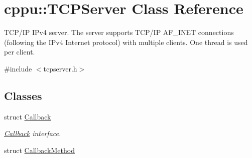\hypertarget{classcppu_1_1_t_c_p_server}{}\section{cppu\+:\+:T\+C\+P\+Server Class Reference}
\label{classcppu_1_1_t_c_p_server}


T\+C\+P/\+IP I\+Pv4 server. The server supports T\+C\+P/\+IP A\+F\+\_\+\+I\+N\+ET connections (following the I\+Pv4 Internet protocol) with multiple clients. One thread is used per client.  




{\ttfamily \#include $<$tcpserver.\+h$>$}

\subsection*{Classes}
\begin{DoxyCompactItemize}
\item 
struct \mbox{\hyperlink{structcppu_1_1_t_c_p_server_1_1_callback}{Callback}}
\begin{DoxyCompactList}\small\item\em \mbox{\hyperlink{structcppu_1_1_t_c_p_server_1_1_callback}{Callback}} interface. \end{DoxyCompactList}\item 
struct \mbox{\hyperlink{structcppu_1_1_t_c_p_server_1_1_callback_method}{Callback\+Method}}
\end{DoxyCompactItemize}
